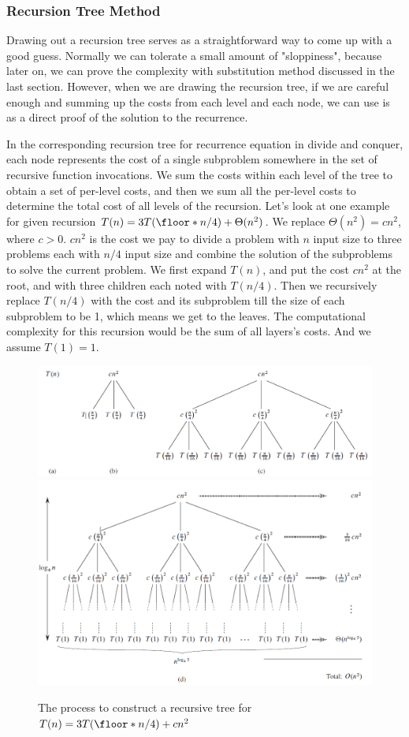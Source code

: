 \documentclass[../algorithms.tex]{subfiles}
\begin{document}
\subsubsection{Recursion Tree Method}
Drawing out a recursion tree serves as a straightforward way to come up with a good guess. Normally we can tolerate a small amount of "sloppiness", because later on, we can prove the complexity with substitution method discussed in the last section. However, when we are drawing the recursion tree, if we are careful enough and summing up the costs from each level and each node, we can use is as a direct proof of the solution to the recurrence. 

In the corresponding recursion tree for recurrence equation in divide and conquer, each node represents the cost of a single subproblem somewhere in the set of recursive function invocations. We sum the costs within each level of the tree to obtain a set of per-level costs, and then we sum all the per-level costs to determine the total cost of all levels of the recursion. Let's look at one example for given recursion $T(n) = 3T(\floor*{n/4}) + \Theta(n^2)$. We replace $\Theta(n^2) = cn^2$, where $c>0$. $cn^2$ is the cost we pay to divide a problem with $n$ input size to three problems each with $n/4$ input size and combine the solution of the subproblems to solve the current problem.  We first expand $T(n)$, and put the cost $cn^2$ at the root, and with three children each noted with $T(n/4)$. Then we recursively replace $T(n/4)$ with the cost and its subproblem till the size of each subproblem to be 1, which means we get to the leaves. The computational complexity for this recursion would be the sum of all layers's costs. And we assume $T(1)=1$.
\begin{figure}[h]
    \centering
    \includegraphics[width=0.8\columnwidth]{fig/recursive_tree_1.png}
    \includegraphics[width=0.8\columnwidth]{fig/recursive_tree_2.png}
    \caption{The process to construct a recursive tree for $T(n) = 3T(\floor*{n/4}) + cn^2$}
    \label{fig:recursive_tree}
\end{figure}
\end{document}

